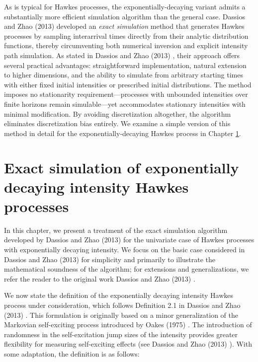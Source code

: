\documentclass[12pt,a4paper]{report}
\theoremstyle{plain}
\theoremstyle{definition}
\theoremstyle{remark}
\newcommand{\1}{\mathbf{1}}
\begin{document}
\medskip
\noindent
As is typical for Hawkes processes, the exponentially-decaying variant admits a substantially more efficient simulation algorithm than the general case. Dassios and Zhao (2013) \cite{DZ13} developed an \emph{exact simulation} method that generates Hawkes processes by sampling interarrival times directly from their analytic distribution functions, thereby circumventing both numerical inversion and explicit intensity path simulation. As stated in Dassios and Zhao (2013) \cite{DZ13}, their approach offers several practical advantages: straightforward implementation, natural extension to higher dimensions, and the ability to simulate from arbitrary starting times with either fixed initial intensities or prescribed initial distributions. The method imposes no stationarity requirement—processes with unbounded intensities over finite horizons remain simulable—yet accommodates stationary intensities with minimal modification. By avoiding discretization altogether, the algorithm eliminates discretization bias entirely. We examine a simple version of this method in detail for the exponentially-decaying Hawkes process in Chapter \ref{chap:7}.

\chapter{Exact simulation of exponentially decaying intensity Hawkes processes}
\label{chap:7}

In this chapter, we present a treatment of the exact simulation algorithm developed by Dassios and Zhao (2013) \cite{DZ13} for the univariate case of Hawkes processes with exponentially decaying intensity. We focus on the basic case considered in Dassios and Zhao (2013) \cite{DZ13} for simplicity and primarily to illustrate the mathematical soundness of the algorithm; for extensions and generalizations, we refer the reader to the original work Dassios and Zhao (2013) \cite{DZ13}.

\medskip
\noindent
We now state the definition of the exponentially decaying intensity Hawkes process under consideration, which follows Definition 2.1 in Dassios and Zhao (2013) \cite{DZ13}. This formulation is originally based on a minor generalization of the Markovian self-exciting process introduced by Oakes (1975) \cite{Oak75}. The introduction of randomness in the self-excitation jump sizes of the intensity provides greater flexibility for measuring self-exciting effects (see Dassios and Zhao (2013) \cite{DZ13}). With some adaptation, the definition is as follows:
\end{document}
